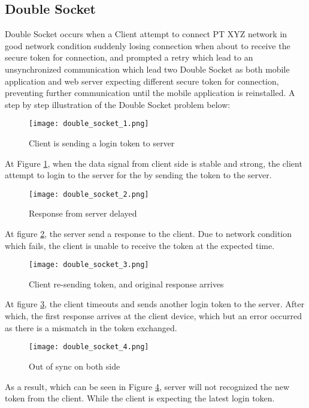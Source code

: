 \subsection{Double Socket}
Double Socket occurs when a Client attempt to connect PT XYZ network in good network condition suddenly losing connection when about to receive the secure token for connection, and prompted a retry which lead to an unsynchronized communication which lead two Double Socket as both mobile application and web server expecting different secure token for connection, preventing further communication until the mobile application is reinstalled.
A step by step illustration of the Double Socket problem below:
\begin{figure}[h]
\centering
\texttt{[image: double\_socket\_1.png]}
\caption{Client is sending a login token to server}
\label{fig:double-socket1}
\end{figure}
At Figure \ref{fig:double-socket1}, when the data signal from client side is stable and strong, the client attempt to login to the server for the by sending the token to the server.
\begin{figure}[h]
\centering
\texttt{[image: double\_socket\_2.png]}
\caption{Response from server delayed}
\label{fig:double-socket2}
\end{figure}

At figure \ref{fig:double-socket2}, the server send a response to the client. Due to network condition which fails, the client is unable to receive the token at the expected time. 
\begin{figure}[h]
\centering
\texttt{[image: double\_socket\_3.png]}
\caption{Client re-sending token, and original response arrives}
\label{fig:double-socket3}
\end{figure}

At figure \ref{fig:double-socket3}, the client timeouts and sends another login token to the server. After which, the first response arrives at the client device, which but an error occurred as there is a mismatch in the token exchanged.

\begin{figure}[h]
\centering
\texttt{[image: double\_socket\_4.png]}
\caption{Out of sync on both side}
\label{fig:double-socket4}
\end{figure}
As a result, which can be seen in Figure \ref{fig:double-socket4}, server will not recognized the new token from the client. While the client is expecting the latest login token. 


